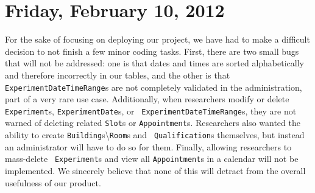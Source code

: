 \documentclass{article}
\begin{document}
\section{Friday, February 10, 2012} %
For the sake of focusing on deploying our project, we have had to make
a difficult decision to not finish a few minor coding tasks. First,
there are two small bugs that will not be addressed: one is that dates
and times are sorted alphabetically and therefore incorrectly in our
tables, and the other is that {\tt ExperimentDateTimeRange}s are not
completely validated in the administration, part of a very rare use
case. Additionally, when researchers modify or delete {\tt
Experiment}s, {\tt ExperimentDate}s, or {\tt
ExperimentDateTimeRange}s, they are not warned of deleting related
{\tt Slot}s or {\tt Appointment}s. Researchers also wanted the ability
to create {\tt Building}s\textbackslash{\tt Room}s and {\tt
Qualification}s themselves, but instead an administrator will have to
do so for them. Finally, allowing researchers to mass-delete {\tt
Experiment}s and view all {\tt Appointment}s in a calendar will not be
implemented. We sincerely believe that none of this will detract from
the overall usefulness of our product.
\end{document}
